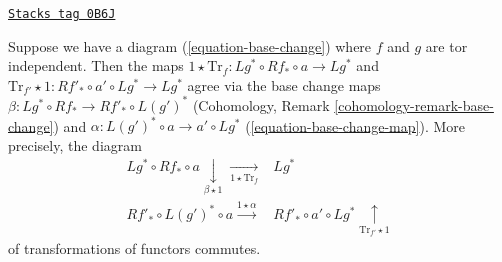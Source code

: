 \begin{lemma}

\label{duality-lemma-trace-map-and-base-change}
\href{https://stacks.math.columbia.edu/tag/0B6J}{\texttt{Stacks tag 0B6J}}

Suppose we have a diagram (\ref{equation-base-change}) where $f$ and $g$
are tor independent. Then the maps
$1 \star \text{Tr}_f : Lg^* \circ Rf_* \circ a \to Lg^*$ and
$\text{Tr}_{f'} \star 1 : Rf'_* \circ a' \circ Lg^* \to Lg^*$
agree via the base change maps
$\beta : Lg^* \circ Rf_* \to Rf'_* \circ L(g')^*$
(Cohomology, Remark \ref{cohomology-remark-base-change})
and $\alpha : L(g')^* \circ a \to a' \circ Lg^*$
(\ref{equation-base-change-map}).
More precisely, the diagram
$$
\begin{array}{cc}Lg^* \circ Rf_* \circ a
\underset{\beta \star 1}{\downarrow}\underset{1 \star \text{Tr}_f}{\longrightarrow} & Lg^* \\ Rf'_* \circ L(g')^* \circ a \overset{1 \star \alpha}{\longrightarrow} & Rf'_* \circ a' \circ Lg^* \underset{\text{Tr}_{f'} \star 1}{\uparrow}\end{array}
$$
of transformations of functors commutes.
\end{lemma}

